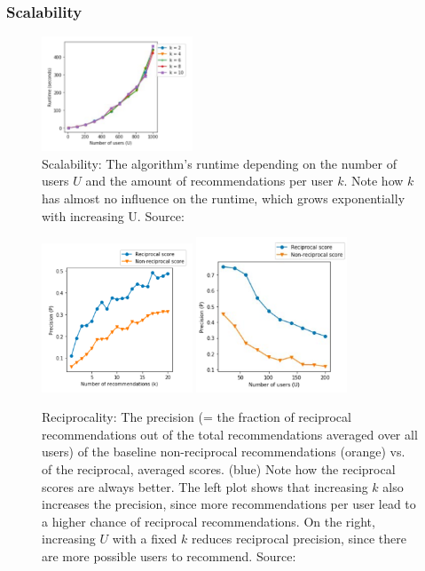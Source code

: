 \documentclass[conference]{IEEEtran}
\begin{document}
\subsubsection{Scalability} \label{paper:scalability}
\begin{figure}[!t]
	\centering
	\includegraphics[width=0.4\textwidth]{g/Runtime.PNG}
	\caption{Scalability: The algorithm's runtime depending on the number of users \(U\) and the amount of recommendations per user \(k\). Note how \(k\) has almost no influence on the runtime, which grows exponentially with increasing U. Source: \cite{potts2018reciprocal}}
	\label{f:scalability}
\end{figure}
\begin{figure}[!t]
	\centering
	\includegraphics[width=0.4\textwidth]{g/PrecisionByK.PNG}
	\includegraphics[width=0.4\textwidth]{g/PrecisionByU.PNG}
	\caption{Reciprocality: The precision (= the fraction of reciprocal recommendations out of the total recommendations averaged over all users) of the baseline non-reciprocal recommendations (orange) vs. of the reciprocal, averaged scores. (blue) Note how the reciprocal scores are always better. The left plot shows that increasing \(k\) also increases the precision, since more recommendations per user lead to a higher chance of reciprocal recommendations. On the right, increasing \(U\) with a fixed \(k\) reduces reciprocal precision, since there are more possible users to recommend. Source: \cite{potts2018reciprocal}}
	\label{f:reciprocality}
\end{figure}
\end{document}
